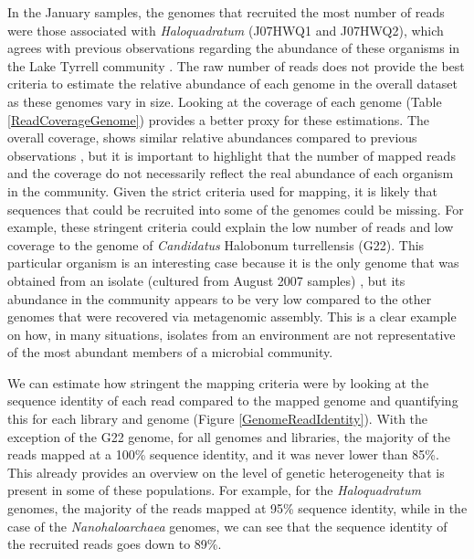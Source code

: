 In the January samples, the genomes that recruited the most number of reads were those associated with \textit{Haloquadratum} (J07HWQ1 and J07HWQ2), which agrees with previous observations regarding the abundance of these organisms in the Lake Tyrrell community \cite{Podell:2013kx}. The raw number of reads does not provide the best criteria to estimate the relative abundance of each genome in the overall dataset as these genomes vary in size. Looking at the coverage of each genome (Table \ref{ReadCoverageGenome}) provides a better proxy for these estimations. The overall coverage, shows similar relative abundances compared to previous observations \cite{Podell:2013kx}, but it is important to highlight that the number of mapped reads and the coverage do not necessarily reflect the real abundance of each organism in the community. Given the strict criteria used for mapping, it is likely that sequences that could be recruited into some of the genomes could be missing. For example, these stringent criteria could explain the low number of reads and low coverage to the genome of \textit{Candidatus} Halobonum turrellensis (G22). This particular organism is an interesting case because it is the only genome that was obtained from an isolate (cultured from August 2007 samples) \cite{Ugalde:2013hb}, but its abundance in the community appears to be very low compared to the other genomes that were recovered via metagenomic assembly. This is a clear example on how, in many situations, isolates from an environment are not representative of the most abundant members of a microbial community.

We can estimate how stringent the mapping criteria were by looking at the sequence identity of each read compared to the mapped genome and quantifying this for each library and genome (Figure \ref{GenomeReadIdentity}). With the exception of the G22 genome, for all genomes and libraries, the majority of the reads mapped at a 100\% sequence identity, and it was never lower than 85\%. This already provides an overview on the level of genetic heterogeneity that is present in some of these populations. For example, for the \textit{Haloquadratum} genomes, the majority of the reads mapped at 95\% sequence identity, while in the case of the \textit{Nanohaloarchaea} genomes, we can see that the sequence identity of the recruited reads goes down to 89\%.

